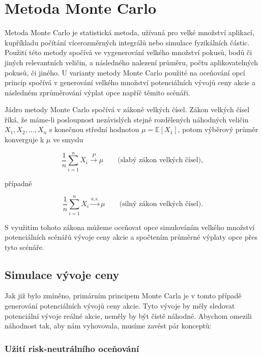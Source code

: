 \documentclass{article}
\begin{document}
\section{Metoda Monte Carlo}

Metoda Monte Carlo je statistická metoda, užívaná pro velké množství aplikací, kupříkladu počítání vícerozměrných integrálů nebo simulace fyzikálních částic. Použití této metody spočívá ve vygenerování velkého množství pokusů, bodů či jiných relevantních veličin, a následného nalezení průměru, počtu aplikovatelných pokusů, či jiného. U varianty metody Monte Carlo použité na oceňování opcí princip spočívá v generování velkého množství potenciálních vývojů ceny akcie a následném zprůměrování výplat opce napříč těmito scénáři.

\citep[Kapitola~1.1]{Glasserman2004}

Jádro metody Monte Carlo spočívá v zákoně velkých čísel. Zákon velkých čísel říká, že máme-li posloupnost nezávislých stejně rozdělených náhodných veličin $X_1, X_2, \dots, X_n$ s konečnou střední hodnotou $\mu = \mathbb{E}[X_1]$, potom výběrový průměr konverguje k $\mu$ ve smyslu

\begin{equation}
  \frac{1}{n}\sum_{i=1}^n X_i \xrightarrow{P} \mu \qquad\text{(slabý zákon velkých čísel)},
\end{equation}

případně

\begin{equation}
  \frac{1}{n}\sum_{i=1}^n X_i \xrightarrow{a.s.} \mu \qquad\text{(silný zákon velkých čísel)}.
\end{equation}

S využitím tohoto zákona můžeme oceňovat opce simulováním velkého množství potenciálních scénářů vývoje ceny akcie a spočtením průměrné výplaty opce přes tyto scénáře.

\citep[Kapitoly~8.2,8.4]{Ross2019}

\subsection{Simulace vývoje ceny}

Jak již bylo zmíněno, primárním principem Monte Carla je v tomto případě generování potenciálních vývojů ceny akcie. Tyto vývoje by měly sledovat potenciální vývoje reálné akcie, neměly by být čistě náhodné. Abychom omezili náhodnost tak, aby nám vyhovovala, musíme zavést pár konceptů:

\subsubsection{Užití risk-neutrálního oceňování}
\end{document}
